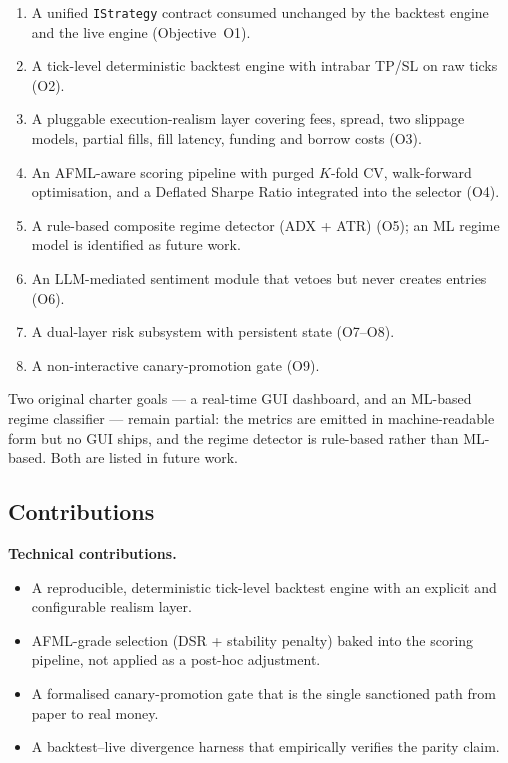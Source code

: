 \documentclass[a4paper, 12pt, titlepage]{article}
\begin{document}
\begin{enumerate}[noitemsep]
    \item A unified \texttt{IStrategy} contract consumed unchanged by
    the backtest engine and the live engine (Objective~O1).
    \item A tick-level deterministic backtest engine with intrabar
    TP/SL on raw ticks (O2).
    \item A pluggable execution-realism layer covering fees, spread,
    two slippage models, partial fills, fill latency, funding and
    borrow costs (O3).
    \item An AFML-aware scoring pipeline with purged $K$-fold CV,
    walk-forward optimisation, and a Deflated Sharpe Ratio
    integrated into the selector (O4).
    \item A rule-based composite regime detector (ADX + ATR) (O5);
    an ML regime model is identified as future work.
    \item An LLM-mediated sentiment module that vetoes but never
    creates entries (O6).
    \item A dual-layer risk subsystem with persistent state (O7--O8).
    \item A non-interactive canary-promotion gate (O9).
\end{enumerate}

Two original charter goals --- a real-time GUI dashboard, and an
ML-based regime classifier --- remain partial: the metrics are
emitted in machine-readable form but no GUI ships, and the regime
detector is rule-based rather than ML-based. Both are listed in
future work.

\subsection{Contributions}

\textbf{Technical contributions.}

\begin{itemize}[noitemsep]
    \item A reproducible, deterministic tick-level backtest engine
    with an explicit and configurable realism layer.
    \item AFML-grade selection (DSR + stability penalty) baked into
    the scoring pipeline, not applied as a post-hoc adjustment.
    \item A formalised canary-promotion gate that is the single
    sanctioned path from paper to real money.
    \item A backtest--live divergence harness that empirically
    verifies the parity claim.
\end{itemize}
\end{document}
